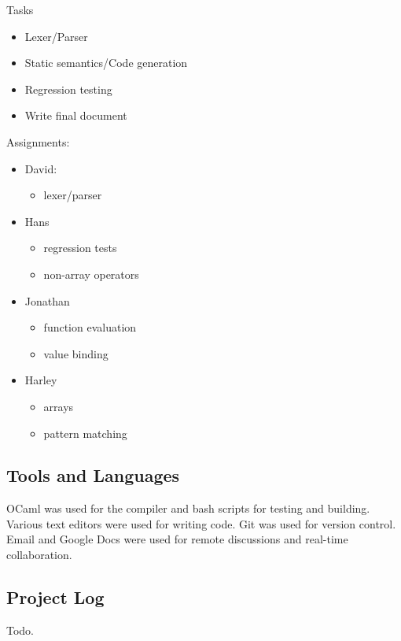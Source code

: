 Tasks
\begin{itemize}
\item Lexer/Parser
\item Static semantics/Code generation
\item Regression testing
\item Write final document
\end{itemize}

Assignments:
\begin{itemize}
\item David:
\begin{itemize}
\item lexer/parser
\end{itemize}
\item Hans
\begin{itemize}
\item regression tests
\item non-array operators
\end{itemize}
\item Jonathan
\begin{itemize}
\item function evaluation
\item value binding
\end{itemize}
\item Harley
\begin{itemize}
\item arrays
\item pattern matching
\end{itemize}
\end{itemize}

\subsection{Tools and Languages}
OCaml was used for the compiler and bash scripts for testing and building. Various text editors were used for writing code. Git was used for version control. Email and Google Docs were used for remote discussions and real-time collaboration.

\subsection{Project Log}
Todo.\\
